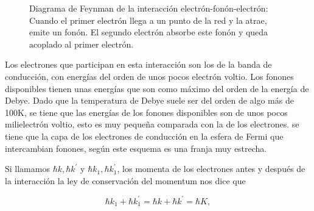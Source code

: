 \begin{figure}[H]
    \center
    \caption[Diagrama de Feynman de la interacción electrón-fonón-electrón]{Diagrama de Feynman de la interacción electrón-fonón-electrón: Cuando el primer electrón llega a un punto de la red y la atrae, emite un fonón. El segundo electrón absorbe este fonón y queda acoplado al primer electrón.}
    \label{fig:feynmanefe}
\end{figure}

Los electrones que participan en esta interacción son los de la banda de conducción, con energías del orden de unos pocos electrón voltio. Los fonones disponibles tienen unas energías que son como máximo del orden de la energía de Debye. Dado que la temperatura de Debye suele ser del orden de algo más de 100K, se tiene que las energías de los fonones disponibles son de unos pocos milielectrón voltio, esto es muy pequeña comparada con la de los electrones. se tiene que la capa de los electrones de conducción en la esfera de Fermi que intercambian fonones, según este esquema es una franja muy estrecha.

Si llamamos $\hbar k, \hbar k^\prime$ y $\hbar k_1, \hbar k_1^\prime$, los momenta de los electrones antes y después de la interacción la ley de conservación del momentum nos dice que

\begin{equation}
    \hbar k_1 + \hbar k_1^\prime = \hbar k + \hbar k^\prime = \hbar K ,
\end{equation}


